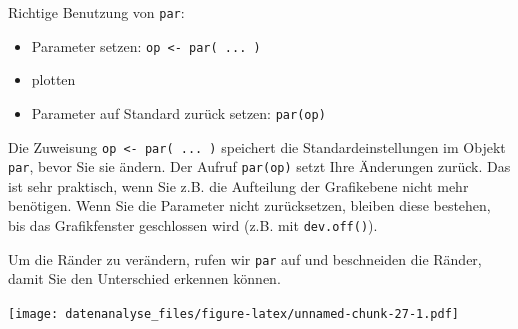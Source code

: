 \documentclass[]{book}
\newenvironment{Shaded}{\begin{snugshade}}{\end{snugshade}}
\newcommand{\CommentTok}[1]{\textcolor[rgb]{0.56,0.35,0.01}{\textit{#1}}}
\newcommand{\DataTypeTok}[1]{\textcolor[rgb]{0.13,0.29,0.53}{#1}}
\newcommand{\DecValTok}[1]{\textcolor[rgb]{0.00,0.00,0.81}{#1}}
\newcommand{\KeywordTok}[1]{\textcolor[rgb]{0.13,0.29,0.53}{\textbf{#1}}}
\newcommand{\NormalTok}[1]{#1}
\newcommand{\OperatorTok}[1]{\textcolor[rgb]{0.81,0.36,0.00}{\textbf{#1}}}
\newcommand{\StringTok}[1]{\textcolor[rgb]{0.31,0.60,0.02}{#1}}
\providecommand{\tightlist}{%
  \setlength{\itemsep}{0pt}\setlength{\parskip}{0pt}}
\newenvironment{rmdalert}{
  \definecolor{alert}{rgb}{0.96, 0.76, 0.76}  %
  \color{black}
  \begin{mdframed}[backgroundcolor = alert]}
 {\end{mdframed}}
\begin{document}
\begin{rmdalert}
Richtige Benutzung von \texttt{par}:

\begin{itemize}
\tightlist
\item
  Parameter setzen: \texttt{op\ \textless{}-\ par(\ ...\ )}
\item
  plotten
\item
  Parameter auf Standard zurück setzen: \texttt{par(op)}
\end{itemize}
\end{rmdalert}

Die Zuweisung \texttt{op\ \textless{}-\ par(\ ...\ )} speichert die Standardeinstellungen im Objekt \texttt{par}, bevor Sie sie ändern. Der Aufruf \texttt{par(op)} setzt Ihre Änderungen zurück. Das ist sehr praktisch, wenn Sie z.B. die Aufteilung der Grafikebene nicht mehr benötigen. Wenn Sie die Parameter nicht zurücksetzen, bleiben diese bestehen, bis das Grafikfenster geschlossen wird (z.B. mit \texttt{dev.off()}).

Um die Ränder zu verändern, rufen wir \texttt{par} auf und beschneiden die Ränder, damit Sie den Unterschied erkennen können.

\begin{Shaded}
\end{Shaded}

\texttt{[image: datenanalyse\_files/figure-latex/unnamed-chunk-27-1.pdf]}
\end{document}
